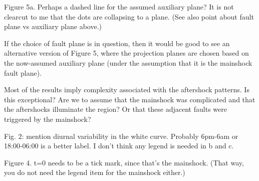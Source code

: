 \documentclass[10pt]{extarticle}
\begin{document}
\begin{ReviewerComment}{1}
\noindent 
Figure 5a. Perhaps a dashed line for the assumed auxiliary plane? It is not clearcut to me that the dots are collapsing to a plane. (See also point about fault plane vs auxiliary plane above.)
\end{ReviewerComment}


\begin{Answer}
 \WorkInProgressRevTask
\end{Answer}
%
%


\begin{ReviewerComment}{1}
\noindent 
If the choice of fault plane is in question, then it would be good to see an alternative version of Figure 5, where the projection planes are chosen based on the now-assumed auxiliary plane (under the assumption that it is the mainshock fault plane).

\end{ReviewerComment}


\begin{Answer}
 \WorkInProgressRevTask
\end{Answer}
%
%


\begin{ReviewerComment}{1}
\noindent 
Most of the results imply complexity associated with the aftershock patterns. Is this exceptional? Are we to assume that the mainshock was complicated and that the aftershocks illuminate the region? Or that these adjacent faults were triggered by the mainshock?

\end{ReviewerComment}


\begin{Answer}
 \WorkInProgressRevTask
\end{Answer}
%
%




\begin{ReviewerComment}{1}
\noindent 
Fig. 2: mention diurnal variability in the white curve. Probably 6pm-6am or 18:00-06:00 is a better label. I don't think any legend is needed in b and c.

\end{ReviewerComment}


\begin{Answer}
 \WorkInProgressRevTask
\end{Answer}
%
%


\begin{ReviewerComment}{1}
\noindent 
Figure 4. t=0 needs to be a tick mark, since that's the mainshock. (That way, you do not need the legend item for the mainshock either.)

\end{ReviewerComment}
\end{document}
